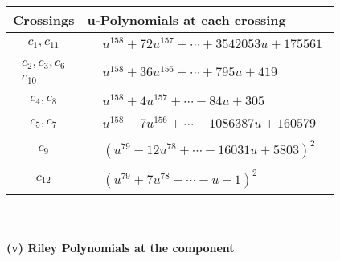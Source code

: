 \documentclass[1p]{elsarticle_modified}
\theoremstyle{definition}
\begin{document}
\begin{tabular}{m{50pt}|m{274pt}}
Crossings & \hspace{64pt}u-Polynomials at each crossing \\
\hline $$\begin{aligned}c_{1},c_{11}\end{aligned}$$&$\begin{aligned}
&u^{158}+72 u^{157}+\cdots+3542053 u+175561
\end{aligned}$\\
\hline $$\begin{aligned}c_{2},c_{3},c_{6}\\c_{10}\end{aligned}$$&$\begin{aligned}
&u^{158}+36 u^{156}+\cdots+795 u+419
\end{aligned}$\\
\hline $$\begin{aligned}c_{4},c_{8}\end{aligned}$$&$\begin{aligned}
&u^{158}+4 u^{157}+\cdots-84 u+305
\end{aligned}$\\
\hline $$\begin{aligned}c_{5},c_{7}\end{aligned}$$&$\begin{aligned}
&u^{158}-7 u^{156}+\cdots-1086387 u+160579
\end{aligned}$\\
\hline $$\begin{aligned}c_{9}\end{aligned}$$&$\begin{aligned}
&(u^{79}-12 u^{78}+\cdots-16031 u+5803)^{2}
\end{aligned}$\\
\hline $$\begin{aligned}c_{12}\end{aligned}$$&$\begin{aligned}
&(u^{79}+7 u^{78}+\cdots- u-1)^{2}
\end{aligned}$\\
\hline
\end{tabular}\\~\\
\newpage\renewcommand{\arraystretch}{1}
\flushleft \textbf{(v) Riley Polynomials at the component}\newline \\
\end{document}
